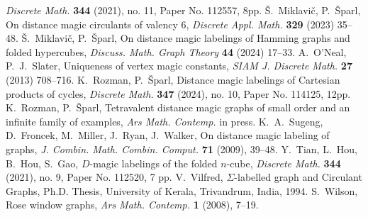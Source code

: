 \documentclass[11 pt,english]{article}
\theoremstyle{definition}
\begin{document}
\begin{thebibliography}{}
	{\em Discrete Math.} {\bf 344} (2021), no. 11, Paper No. 112557, 8pp.
 \v S.~Miklavi\v c, P.~\v Sparl,
	On distance magic circulants of valency 6, 
	{\em Discrete Appl. Math.} {\bf 329} (2023) 35--48.
 \v S.~Miklavi\v c, P.~\v Sparl,
	On distance magic labelings of Hamming graphs and folded hypercubes, 
	{\em Discuss. Math. Graph Theory} {\bf 44} (2024) 17--33.
 A.~O'Neal, P.~J.~Slater, 
	Uniqueness of vertex magic constants, 
	{\em SIAM J. Discrete Math.} {\bf 27} (2013) 708--716.
 K.~Rozman, P.~\v Sparl,
Distance magic labelings of Cartesian products of cycles,
{\em Discrete Math.} {\bf 347} (2024), no. 10, Paper No. 114125, 12pp.
 K.~Rozman, P.~\v Sparl,
	Tetravalent distance magic graphs of small order and an infinite family of examples,
	{\em Ars Math. Contemp.} in press.
 K.~A.~Sugeng, D.~Froncek, M.~Miller, J.~Ryan, J.~Walker, 
	On distance magic labeling of graphs, 
	{\em J. Combin. Math. Combin. Comput.} {\bf 71} (2009), 39--48.
 Y.~Tian, L.~Hou, B.~Hou, S.~Gao,
	$D$-magic labelings of the folded $n$-cube,
	{\em Discrete Math.} {\bf 344} (2021), no. 9, Paper No. 112520, 7 pp.
 V.~Vilfred, 
	$\Sigma$-labelled graph and Circulant Graphs, Ph.D. Thesis, University of Kerala, Trivandrum, India, 1994.
 S.~Wilson, 
	Rose window graphs, 
	{\em Ars Math. Contemp.} {\bf 1} (2008), 7--19.
\end{thebibliography}



	


	
\end{document}
